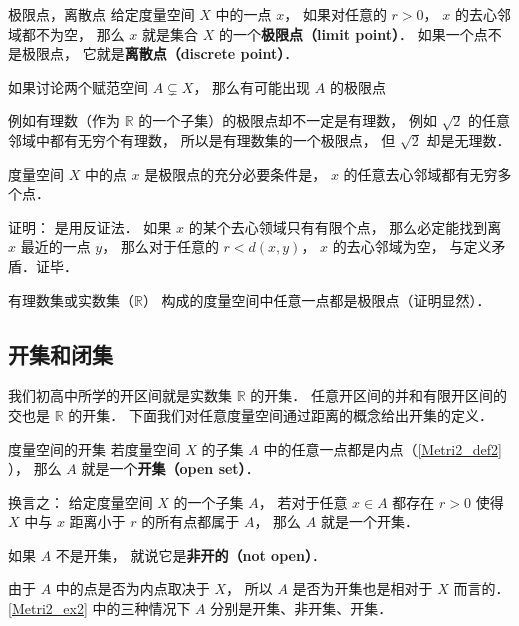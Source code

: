 \begin{definition}{极限点，离散点}
给定度量空间 $X$ 中的一点 $x$， 如果对任意的 $r > 0$， $x$ 的去心邻域都不为空， 那么 $x$ 就是集合 $X$ 的一个\textbf{极限点（limit point）}． 如果一个点不是极限点， 它就是\textbf{离散点（discrete point）}．
\end{definition}
如果讨论两个赋范空间 $A \subsetneq X$， 那么有可能出现 $A$ 的极限点

例如有理数（作为 $\mathbb R$ 的一个子集）的极限点却不一定是有理数， 例如 $\sqrt{2}$ 的任意邻域中都有无穷个有理数， 所以是有理数集的一个极限点， 但 $\sqrt{2}$ 却是无理数．

\begin{corollary}{}
度量空间 $X$ 中的点 $x$ 是极限点的充分必要条件是， $x$ 的任意去心邻域都有无穷多个点．
\end{corollary}
证明： 是用反证法． 如果 $x$ 的某个去心领域只有有限个点， 那么必定能找到离 $x$ 最近的一点 $y$， 那么对于任意的 $r < d(x, y)$， $x$ 的去心邻域为空， 与定义矛盾．证毕．

\begin{example}{}\label{Metri2_ex2}
有理数集或实数集（$\mathbb R$） 构成的度量空间中任意一点都是极限点（证明显然）．
\end{example}


\subsection{开集和闭集}
我们初高中所学的开区间就是实数集 $\mathbb R$ 的开集． 任意开区间的并和有限开区间的交也是 $\mathbb R$ 的开集． 下面我们对任意度量空间通过距离的概念给出开集的定义．

\begin{definition}{度量空间的开集}
若度量空间 $X$ 的子集 $A$ 中的任意一点都是内点（\autoref{Metri2_def2} ）， 那么 $A$ 就是一个\textbf{开集（open set）}．

换言之： 给定度量空间 $X$ 的一个子集 $A$， 若对于任意 $x \in A$ 都存在 $r > 0$ 使得 $X$ 中与 $x$ 距离小于 $r$ 的所有点都属于 $A$， 那么 $A$ 就是一个开集．

如果 $A$ 不是开集， 就说它是\textbf{非开的（not open）}．
\end{definition}
由于 $A$ 中的点是否为内点取决于 $X$， 所以 $A$ 是否为开集也是相对于 $X$ 而言的． \autoref{Metri2_ex2} 中的三种情况下 $A$ 分别是开集、非开集、开集．

